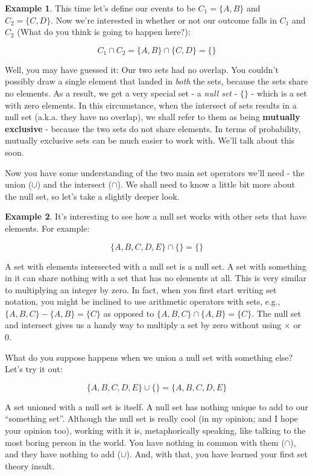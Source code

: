 \documentclass[
]{book}
\theoremstyle{definition}
\theoremstyle{definition}
\newtheorem{example}{Example}[chapter]
\theoremstyle{definition}
\theoremstyle{definition}
\theoremstyle{remark}
\begin{document}
\begin{example}
This time let's define our events to be \(C_1 = \{A,B\}\) and \(C_2 = \{C,D\}\). Now we're interested in whether or not our outcome falls in \(C_1\) and \(C_2\) (What do you think is going to happen here?):

\[ C_1 \cap C_2 = \{A, B\} \cap \{C, D\} = \{\} \]

Well, you may have guessed it: Our two sets had no overlap. You couldn't possibly draw a single element that landed in \emph{both} the sets, because the sets share no elements. As a result, we get a very special set - a \emph{null set} - \(\{\}\) - which is a set with zero elements. In this circumstance, when the intersect of sets results in a null set (a.k.a. they have no overlap), we shall refer to them as being \textbf{mutually exclusive} - because the two sets do not share elements. In terms of probability, mutually exclusive sets can be much easier to work with. We'll talk about this soon.
\end{example}

Now you have some understanding of the two main set operators we'll need - the union (\(\cup\)) and the intersect (\(\cap\)). We shall need to know a little bit more about the null set, so let's take a slightly deeper look.

\begin{example}
It's interesting to see how a null set works with other sets that have elements. For example:

\[ \{A,B,C,D,E\} \cap \{\} = \{\} \]

A set with elements intersected with a null set is a null set. A set with something in it can share nothing with a set that has no elements at all. This is very similar to multiplying an integer by zero. In fact, when you first start writing set notation, you might be inclined to use arithmetic operators with sets, e.g., \(\{A,B,C\} - \{A,B\} = \{C\}\) as opposed to \(\{A,B,C\} \cap \{A,B\} = \{C\}\). The null set and intersect gives us a handy way to multiply a set by zero without using \(\times\) or 0.

What do you suppose happens when we union a null set with something else? Let's try it out:

\[ \{A,B,C,D,E\} \cup \{\} = \{A,B,C,D,E\} \]

A set unioned with a null set is itself. A null set has nothing unique to add to our ``something set''. Although the null set is really cool (in my opinion; and I hope your opinion too), working with it is, metaphorically speaking, like talking to the most boring person in the world. You have nothing in common with them (\(\cap\)), and they have nothing to add (\(\cup\)). And, with that, you have learned your first set theory insult.
\end{example}
\end{document}
